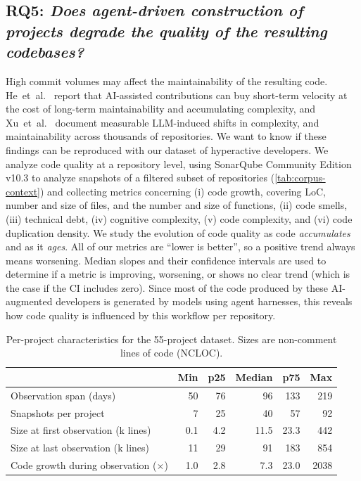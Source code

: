 \documentclass[smallextended]{svjour3}
\begin{document}
\subsection*{RQ5: \emph{Does agent-driven construction of projects degrade the quality of the resulting codebases?}}

High commit volumes may affect the
maintainability of the resulting code. He~et~al.~\cite{he2025speed} report that
AI-assisted contributions can buy short-term velocity at the cost of long-term
maintainability and accumulating complexity, and Xu~et~al.~\cite{Xu2026} document
measurable LLM-induced shifts in complexity, and maintainability
across thousands of repositories. We want to know if these findings can be reproduced with our dataset of hyperactive developers.
We analyze code quality at a repository level, using SonarQube Community Edition v10.3 to analyze snapshots of a filtered subset of repositories (\autoref{tab:corpus-context}) and collecting metrics concerning (i) code growth, covering LoC, number and size of files, and the number and size of functions, (ii) code smells, (iii) technical debt, (iv) cognitive complexity, (v) code complexity, and (vi) code duplication density.
We study the evolution of code quality as code \emph{accumulates} and as it \emph{ages}. All of our metrics are ``lower is better'', so a positive trend always means worsening. Median slopes and their confidence intervals are used to determine if a metric is improving, worsening, or shows no clear trend (which is the case if the CI includes zero).
Since most of the code produced by these AI-augmented developers is generated by models using agent harnesses, this reveals how code quality is influenced by this workflow per repository.


\begin{table}[tbp]
\centering
\begin{tabular}{l r r r r r}
\hline
 & Min & p25 & Median & p75 & Max \\
\hline
Observation span (days) & 50 & 76 & 96 & 133 & 219 \\
Snapshots per project & 7 & 25 & 40 & 57 & 92 \\
Size at first observation (k lines) & 0.1 & 4.2 & 11.5 & 23.3 & 442 \\
Size at last observation (k lines) & 11 & 29 & 91 & 183 & 854 \\
Code growth during observation ($\times$) & 1.0 & 2.8 & 7.3 & 23.0 & 2038 \\
\hline
\end{tabular}
\caption{Per-project characteristics for the 55-project dataset. Sizes are non-comment lines of code (NCLOC).}
\label{tab:corpus-context}
\end{table}
\end{document}
